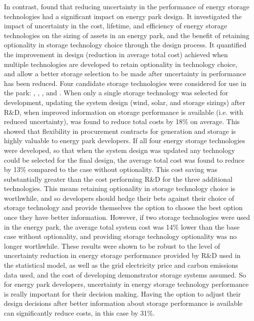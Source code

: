 In contrast,  found that reducing uncertainty in the performance of energy storage technologies had a significant impact on energy park design. It investigated the impact of uncertainty in the cost, lifetime, and efficiency of energy storage technologies on the sizing of assets in an energy park, and the benefit of retaining optionality in storage technology choice through the design process. It quantified the improvement in design (reduction in average total cost) achieved when multiple technologies are developed to retain optionality in technology choice, and allow a better storage selection to be made after uncertainty in performance has been reduced. Four candidate storage technologies were considered for use in the park: , , , and .
When only a single storage technology was selected for development, updating the system design (wind, solar, and storage sizings) after R\&D, when improved information on storage performance is available (i.e. with reduced uncertainty), was found to reduce total costs by 18\% on average. This showed that flexibility in procurement contracts for generation and storage is highly valuable to energy park developers.
If all four energy storage technologies were developed, so that when the system design was updated any technology could be selected for the final design, the average total cost was found to reduce by 13\% compared to the case without optionality. This cost saving was substantially greater than the cost performing R\&D for the three additional technologies. This means retaining optionality in storage technology choice is worthwhile, and so developers should hedge their bets against their choice of storage technology and provide themselves the option to choose the best option once they have better information. However, if two storage technologies were used in the energy park, the average total system cost was 14\% lower than the base case without optionality, and providing storage technology optionality was no longer worthwhile.
These results were shown to be robust to the level of uncertainty reduction in energy storage performance provided by R\&D used in the statistical model, as well as the grid electricity price and carbon emissions data used, and the cost of developing demonstrator storage systems assumed.
So for energy park developers, uncertainty in energy storage technology performance is really important for their decision making. Having the option to adjust their design decisions after better information about storage performance is available can significantly reduce costs, in this case by 31\%.\\

